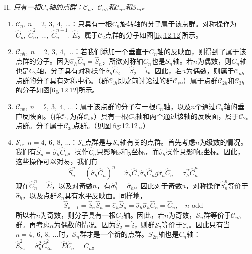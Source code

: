     \begin{center}
        II. \textit{只有一根$C_n$轴的点群：$\mathscr{C}_n$、$\mathscr{C}_{nh}$和$\mathscr{C}_{nv}$和$\mathscr{S}_{2n}$。}
    \end{center}
    \begin{enumerate}
        \item $\mathscr{C}_n, \: n = 2,\:3,\:4,\:\ldots$：只具有一根$C_n$旋转轴的分子属于该点群。对称操作为$\hat{C}_n,\: \hat{C}_n^2,\:\ldots,\:\hat{C}_n^{n-1},\:\hat{E}$。属于$\mathscr{C}_2$点群的分子如图\ref{fig:12.12}所示。
        \item $\mathscr{C}_{nh}, \: n = 2,\:3,\:4,\:\ldots$：若我们添加一个垂直于$C_n$轴的反映面，则得到了属于该点群的分子。因为$\hat{\sigma}_h\hat{C}_n = \hat{S}_n$，所欲对称轴$C_n$也是$S_n$轴。若$n$为偶数，则$C_n$轴也是$C_2$轴，分子具有对称操作$\hat{\sigma}_h\hat{C}_2 = \hat{S}_2 = \hat{i}$。因此，若$n$为偶数，则属于$\mathscr{C}_{nh}$点群的分子具有对称中心。（群$\mathscr{C}_{1h}$即之前讨论过的群$\mathscr{C}_s$。）属于点群$\mathscr{C}_{2h}$和$\mathscr{C}_{3h}$的分子如图\ref{fig:12.12}所示。
        \item $\mathscr{C}_{nv}, \: n = 2,\:3,\:4,\:\ldots$：属于该点群的分子有一根$C_n$轴，以及$n$个通过$C_n$轴的垂直反映面。（群$\mathscr{C}_{1v}$为群$\mathscr{C}_s$。）具有一根$C_2$轴和两个通过该轴的反映面，属于$\mathscr{C}_{2v}$点群。分子属于$\mathscr{C}_{3v}$点群。（见图\ref{fig:12.12}。）
        \item $\mathscr{S}_n, \: n = 4,\:6,\:8,\:\ldots$：$\mathscr{S}_n$点群是与$S_n$轴有关的点群。首先考虑$n$为级数的情况。我们有$\hat{S}_n = \hat{\sigma}_h\hat{C}_n$。操作$\hat{C}_n$只影响$x$和$y$坐标，而$\hat{\sigma}_h$操作只影响$z$坐标。因此，这些操作可以对易，我们有
        \begin{equation*}
            \hat{S}_{n}^{n} = (\hat{\sigma}_{h} \hat{C}_{n})^{n} = \hat{\sigma}_{h} \hat{C}_{n} \hat{\sigma}_{h} \hat{C}_{n} g \hat{\sigma}_{h} \hat{C}_{n} = \hat{\sigma}_{h}^{n} \hat{C}_{n}^{n}
        \end{equation*}
        现在$\hat{C}_{n}^{n} = \hat{E}$，以及对奇数$n$，有$\hat{\sigma}_{h}^{n} = \hat{\sigma}_{h}$。因此对于奇数$n$，对称操作$\hat{S}_n^n$等价于$\hat{\sigma}_h$，以及点群$\mathscr{S}_n$具有水平反映面。同样地，
        \begin{equation*}
            \hat{S}_{n+1} = \hat{S}_{n}\hat{S}_{n} = \hat{\sigma}_{h} \hat{S}_{n} = \hat{\sigma}_{h} \hat{\sigma}_{h} \hat{C}_{n} = \hat{C}_{n}, \quad n \text{ odd}
        \end{equation*}
        所以若$n$为奇数，则分子具有一根$C_2$轴。因此，若$n$为奇数，$\mathscr{S}_n$群等价于$\mathscr{C}_{nh}$群。再考虑$n$为偶数的情况。因为$\hat{S}_2=\hat{i}$，则群$\mathscr{S}_2$等价于$\mathscr{C}_i$。因此只有当$n = 4,\:6,\:8,\:\ldots$时，$\mathscr{S}_n$群才是一个新的点群。$S_{2n}$轴也是$C_n$轴：$\hat{S}_{2n}^2 = \hat{\sigma}_h^2 \hat{C}_{2n}^2 = \hat{E}\hat{C}_n = \hat{C}_n$。
    \end{enumerate}

